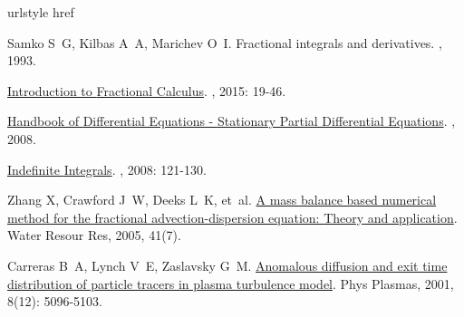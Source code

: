 \begin{thebibliography}{79}
    \providecommand{\natexlab}[1]{#1}
    \providecommand{\url}[1]{#1}
    \expandafter\ifx\csname urlstyle\endcsname\relax\else
      \fi
    \expandafter\ifx\csname href\endcsname\relax
      \DeclareUrlCommand{}
      \def\eprint#1#2{#2}
    \else
      \def\doi#1{\href{https://doi.org/#1}{\nolinkurl{#1}}}
      \let\eprint\href
    \fi
    
    Samko S~G, Kilbas A~A, Marichev O~I.
    \newblock Fractional integrals and derivatives\allowbreak[M].
    , 1993.
    
    \href{https://www.taylorfrancis.com/books/9781482253818/chapters/10.1201/b18503-6}{Introduction to {{Fractional Calculus}}}\allowbreak[M].
    , 2015: 19-46.
    
    \href{https://linkinghub.elsevier.com/retrieve/pii/S1874573308X80167}{Handbook of {{Differential Equations}} - {{Stationary Partial Differential Equations}}}\allowbreak[M].
    , 2008.
    
    \href{https://www.taylorfrancis.com/books/9781584889571/chapters/10.1201/9781584889571-7}{Indefinite {{Integrals}}}\allowbreak[M].
    , 2008: 121-130.
    
    Zhang X, Crawford J~W, Deeks L~K, et~al.
    \newblock \href{http://doi.wiley.com/10.1029/2004WR003818}{A mass balance based numerical method for the fractional advection-dispersion equation: {{Theory}} and application}\allowbreak[J].
    \newblock Water Resour Res, 2005, 41\allowbreak (7).
    
    Carreras B~A, Lynch V~E, Zaslavsky G~M.
    \newblock \href{http://aip.scitation.org/doi/10.1063/1.1416180}{Anomalous diffusion and exit time distribution of particle tracers in plasma turbulence model}\allowbreak[J].
    \newblock Phys Plasmas, 2001, 8\allowbreak (12): 5096-5103.
    

\end{thebibliography}
